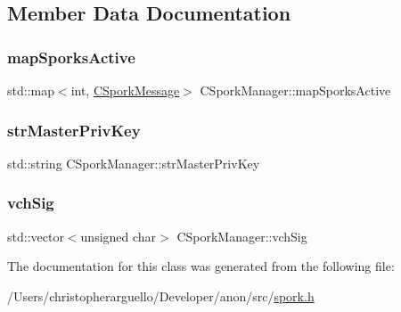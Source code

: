 \subsection{Member Data Documentation}
\mbox{\label{class_c_spork_manager_a46533ed5fc6386662995932f688f23db}} 
\subsubsection{\texorpdfstring{map\+Sporks\+Active}{mapSporksActive}}
{\footnotesize\ttfamily std\+::map$<$int, \mbox{\hyperlink{class_c_spork_message}{C\+Spork\+Message}}$>$ C\+Spork\+Manager\+::map\+Sporks\+Active\hspace{0.3cm}{\ttfamily [private]}}

\mbox{\label{class_c_spork_manager_a19c054c477f3131a2d52c907a71bf234}} 
\subsubsection{\texorpdfstring{str\+Master\+Priv\+Key}{strMasterPrivKey}}
{\footnotesize\ttfamily std\+::string C\+Spork\+Manager\+::str\+Master\+Priv\+Key\hspace{0.3cm}{\ttfamily [private]}}

\mbox{\label{class_c_spork_manager_a5ae0ef66c2d2c1db5554494f91317c0b}} 
\subsubsection{\texorpdfstring{vch\+Sig}{vchSig}}
{\footnotesize\ttfamily std\+::vector$<$unsigned char$>$ C\+Spork\+Manager\+::vch\+Sig\hspace{0.3cm}{\ttfamily [private]}}



The documentation for this class was generated from the following file\+:\begin{DoxyCompactItemize}
\item 
/\+Users/christopherarguello/\+Developer/anon/src/\mbox{\hyperlink{spork_8h}{spork.\+h}}\end{DoxyCompactItemize}

